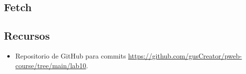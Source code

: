\documentclass{article}
\begin{document}
 \subsection{Fetch}
 
  

  \subsection{Recursos}
  \begin{itemize}
    \item Repositorio de GitHub para commits \url{https://github.com/gusCreator/pweb-course/tree/main/lab10}.
  \end{itemize}
    

\clearpage
	
%
%
%
			
\end{document}
